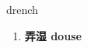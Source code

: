 
\begin{frame}
{\huge drench}
\begin{center}
\begin{enumerate}\Large
  \item \textbf{弄湿 douse}
\end{enumerate}
\end{center}
\end{frame}
